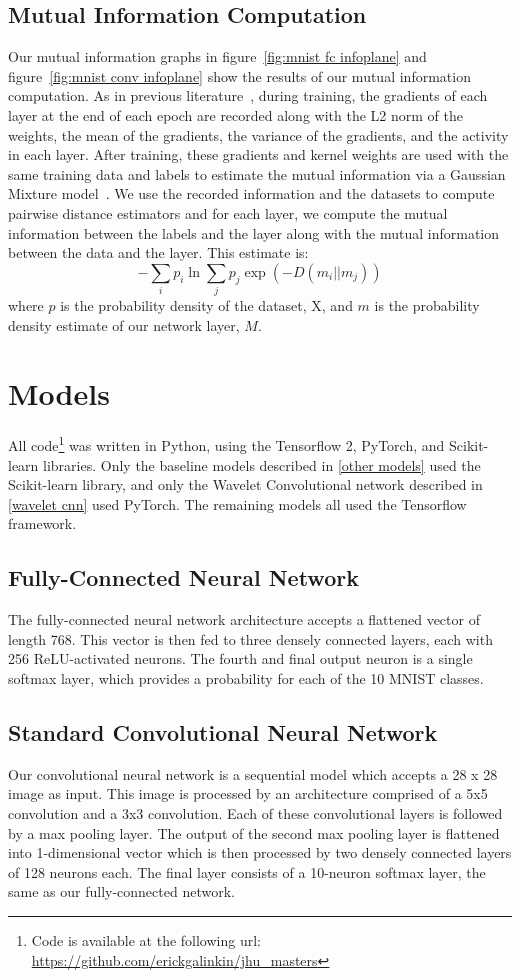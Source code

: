\subsection{Mutual Information Computation}
Our mutual information graphs in figure~\ref{fig:mnist fc infoplane} and figure~\ref{fig:mnist conv infoplane} show the results of our mutual information computation.
As in previous literature~\cite{shwartz2017opening, saxe2019information}, during training, the gradients of each layer at the end of each epoch are recorded along with the L2 norm of the weights, the mean of the gradients, the variance of the gradients, and the activity in each layer.
After training, these gradients and kernel weights are used with the same training data and labels to estimate the mutual information via a Gaussian Mixture model~\cite{kolchinsky2017estimating}.
We use the recorded information and the datasets to compute pairwise distance estimators and for each layer, we compute the mutual information between the labels and the layer along with the mutual information between the data and the layer.
This estimate is:
$$-\sum_{i} p_i \ln \sum_{j} p_j \exp(-D(m_i || m_j))$$
where $p$ is the probability density of the dataset, X, and $m$ is the probability density estimate of our network layer, $M$.

\section{Models}\label{model_descriptions}
All code\footnote{Code is available at the following url: \url{https://github.com/erickgalinkin/jhu_masters}} was written in Python, using the Tensorflow 2, PyTorch, and Scikit-learn libraries.
Only the baseline models described in \ref{other models} used the Scikit-learn library, and only the Wavelet Convolutional network described in \ref{wavelet cnn} used PyTorch.
The remaining models all used the Tensorflow framework.

\subsection{Fully-Connected Neural Network}
The fully-connected neural network architecture accepts a flattened vector of length 768.
This vector is then fed to three densely connected layers, each with 256 ReLU-activated neurons.
The fourth and final output neuron is a single softmax layer, which provides a probability for each of the 10 MNIST classes.

\subsection{Standard Convolutional Neural Network}
Our convolutional neural network is a sequential model which accepts a 28 x 28 image as input.
This image is processed by an architecture comprised of a 5x5 convolution and a 3x3 convolution.
Each of these convolutional layers is followed by a max pooling layer.
The output of the second max pooling layer is flattened into 1-dimensional vector which is then processed by two densely connected layers of 128 neurons each. 
The final layer consists of a 10-neuron softmax layer, the same as our fully-connected network.

